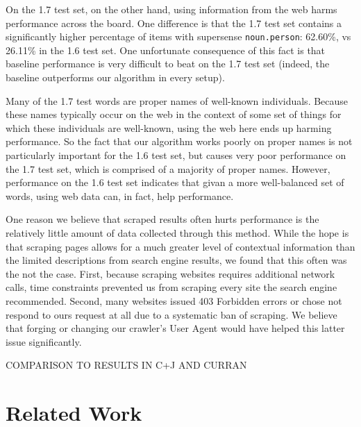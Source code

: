 \documentclass{article}
\begin{document}
On the 1.7 test set, on the other hand, using information from the web harms performance across the board.
One difference is that the 1.7 test set contains a significantly higher percentage of items with supersense {\tt noun.person}: 62.60\%, vs 26.11\% in the 1.6 test set.
One unfortunate consequence of this fact is that baseline performance is very difficult to beat on the 1.7 test set (indeed, the baseline outperforms our algorithm in every setup).

Many of the 1.7 test words are proper names of well-known individuals.
Because these names typically occur on the web in the context of some set of things for which these individuals are well-known, using the web here ends up harming performance.
So the fact that our algorithm works poorly on proper names is not particularly important for the 1.6 test set, but causes very poor performance on the 1.7 test set, which is comprised of a majority of proper names.
However, performance on the 1.6 test set indicates that givan a more well-balanced set of words, using web data can, in fact, help performance.

One reason we believe that scraped results often hurts performance is the relatively little amount of data collected through this method.
While the hope is that scraping pages allows for a much greater level of contextual information than the limited descriptions from search engine results, we found that this often was the not the case.
First, because scraping websites requires additional network calls, time constraints prevented us from scraping every site the search engine recommended.
Second, many websites issued 403 Forbidden errors or chose not respond to ours request at all due to a systematic ban of scraping.
We believe that forging or changing our crawler's User Agent would have helped this latter issue significantly.

COMPARISON TO RESULTS IN C+J AND CURRAN

\section{Related Work}

\end{document}
